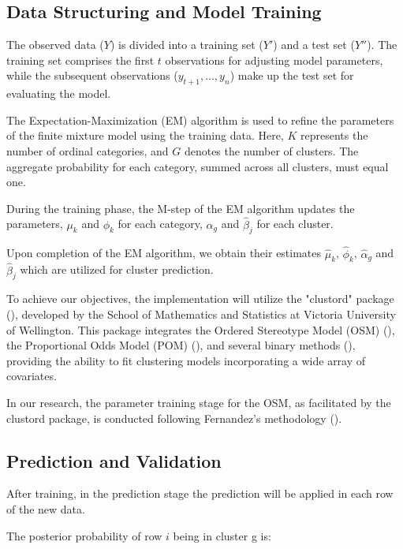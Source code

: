 \documentclass{article}
\begin{document}
\subsection{Data Structuring and Model Training}

The observed data ($Y$) is divided into a training set ($Y'$) and a test set ($Y''$). The training set comprises the first $t$ observations for adjusting model parameters, while the subsequent observations ($y_{t+1}, \dots, y_n$) make up the test set for evaluating the model.

The Expectation-Maximization (EM) algorithm is used to refine the parameters of the finite mixture model using the training data. Here, $K$ represents the number of ordinal categories, and $G$ denotes the number of clusters. The aggregate probability for each category, summed across all clusters, must equal one.

During the training phase, the M-step of the EM algorithm updates the parameters, $\mu_k$ and $\phi_k$ for each category, $\alpha_g$ and $\hat{\beta}_j$ for each cluster.

Upon completion of the EM algorithm, we obtain their estimates $\hat{\mu}_k$, $\hat{\phi}_k$, $\hat{\alpha}_g$ and $\hat{\beta}_j$ which are utilized for cluster prediction.

To achieve our objectives, the implementation will utilize the "clustord" package (\cite{clustord2024}), 
developed by the School of Mathematics and Statistics at Victoria University of Wellington. 
This package integrates the Ordered Stereotype Model (OSM) (\cite{fernandez2016mixture}), the Proportional Odds Model (POM) (\cite{matechou2016biclustering}), and several binary methods (\cite{pledger2014multivariate}), 
providing the ability to fit clustering models incorporating a wide array of covariates.

In our research, the parameter training stage for the OSM, as facilitated by the clustord package, is conducted following Fernandez's methodology (\cite{fernandez2016mixture}).

\subsection{Prediction and Validation}

After training, in the prediction stage the prediction will be applied in each row of the new data.

The posterior probability of row $i$ being in cluster g is:
\end{document}
